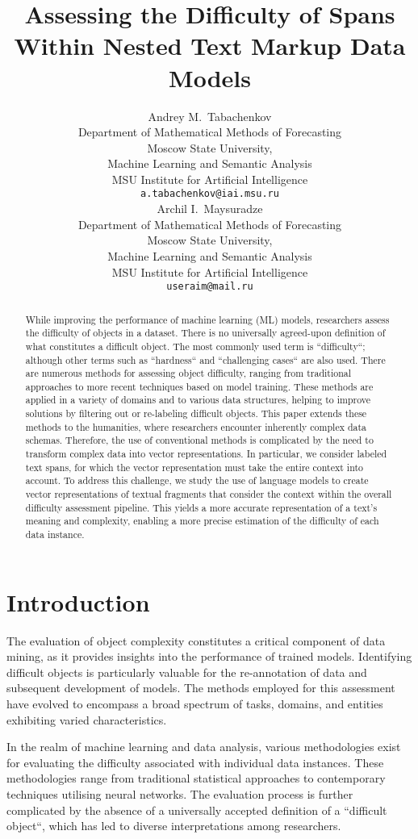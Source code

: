 \documentclass{article}
\title{Assessing the Difficulty of Spans Within Nested Text Markup Data Models}
\author{ Andrey M.~Tabachenkov\\
	Department of Mathematical Methods of Forecasting\\
	Moscow State University,\\
	  Machine Learning and Semantic Analysis \\
    MSU Institute for Artificial Intelligence \\
	\texttt{a.tabachenkov@iai.msu.ru} \\
	\And
	Archil I.~Maysuradze \\
	Department of Mathematical Methods of Forecasting\\
	Moscow State University,\\
	Machine Learning and Semantic Analysis \\
    MSU Institute for Artificial Intelligence \\
	\texttt{useraim@mail.ru} \\
}
\date{}
\begin{document}
\maketitle

\begin{abstract}
    While improving the performance of machine learning (ML) models, researchers assess the difficulty of objects in a dataset. There is no universally agreed-upon definition of what constitutes a difficult object. The most commonly used term is ``difficulty``; although other terms such as ``hardness`` and ``challenging cases`` are also used. There are numerous methods for assessing object difficulty, ranging from traditional approaches to more recent techniques based on model training. These methods are applied in a variety of domains and to various data structures, helping to improve solutions by filtering out or re-labeling difficult objects. This paper extends these methods to the humanities, where researchers encounter inherently complex data schemas. Therefore, the use of conventional methods is complicated by the need to transform complex data into vector representations. In particular, we consider labeled text spans, for which the vector representation must take the entire context into account. To address this challenge, we study the use of language models to create vector representations of textual fragments that consider the context within the overall difficulty assessment pipeline. This yields a more accurate representation of a text's meaning and complexity, enabling a more precise estimation of the difficulty of each data instance.

\end{abstract}

\section{Introduction}
The evaluation of object complexity constitutes a critical component of data mining, as it provides insights into the performance of trained models. Identifying difficult objects is particularly valuable for the re-annotation of data and subsequent development of models. The methods employed for this assessment have evolved to encompass a broad spectrum of tasks, domains, and entities exhibiting varied characteristics.

In the realm of machine learning and data analysis, various methodologies exist for evaluating the difficulty associated with individual data instances. These methodologies range from traditional statistical approaches to contemporary techniques utilising neural networks. The evaluation process is further complicated by the absence of a universally accepted definition of a ``difficult object``, which has led to diverse interpretations among researchers.
\end{document}
